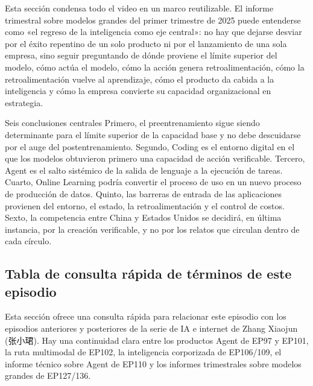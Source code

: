 \documentclass[a4paper]{article}
\begin{document}
Esta sección condensa todo el video en un marco reutilizable. El informe trimestral sobre modelos grandes del primer trimestre de 2025 puede entenderse como «el regreso de la inteligencia como eje central»: no hay que dejarse desviar por el éxito repentino de un solo producto ni por el lanzamiento de una sola empresa, sino seguir preguntando de dónde proviene el límite superior del modelo, cómo actúa el modelo, cómo la acción genera retroalimentación, cómo la retroalimentación vuelve al aprendizaje, cómo el producto da cabida a la inteligencia y cómo la empresa convierte su capacidad organizacional en estrategia.

\begin{importantbox}{Seis conclusiones centrales}
Primero, el preentrenamiento sigue siendo determinante para el límite superior de la capacidad base y no debe descuidarse por el auge del postentrenamiento. Segundo, Coding es el entorno digital en el que los modelos obtuvieron primero una capacidad de acción verificable. Tercero, Agent es el salto sistémico de la salida de lenguaje a la ejecución de tareas. Cuarto, Online Learning podría convertir el proceso de uso en un nuevo proceso de producción de datos. Quinto, las barreras de entrada de las aplicaciones provienen del entorno, el estado, la retroalimentación y el control de costos. Sexto, la competencia entre China y Estados Unidos se decidirá, en última instancia, por la creación verificable, y no por los relatos que circulan dentro de cada círculo.
\end{importantbox}

\subsection{Tabla de consulta rápida de términos de este episodio}

Esta sección ofrece una consulta rápida para relacionar este episodio con los episodios anteriores y posteriores de la serie de IA e internet de Zhang Xiaojun (张小珺). Hay una continuidad clara entre los productos Agent de EP97 y EP101, la ruta multimodal de EP102, la inteligencia corporizada de EP106/109, el informe técnico sobre Agent de EP110 y los informes trimestrales sobre modelos grandes de EP127/136.
\end{document}
